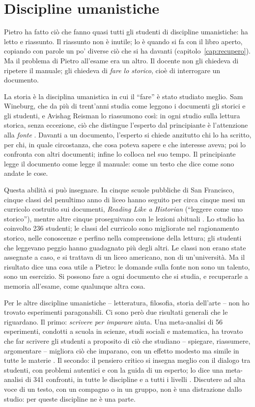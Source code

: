 \section{Discipline umanistiche}

Pietro ha fatto ciò che fanno quasi tutti gli studenti di discipline
umanistiche: ha letto e riassunto. Il riassunto non è inutile; lo è
quando si fa con il libro aperto, copiando con parole un po' diverse
ciò che si ha davanti (capitolo~\ref{cap:recupero}). Ma il problema di
Pietro all'esame era un altro. Il docente non gli chiedeva di ripetere
il manuale; gli chiedeva di \emph{fare lo storico}, cioè di interrogare
un documento.

La storia è la disciplina umanistica in cui il \enquote{fare} è stato
studiato meglio. Sam Wineburg, che da più di trent'anni studia come leggono i
documenti gli storici e gli studenti, e Avishag Reisman lo riassumono
così: in ogni studio sulla lettura storica, senza eccezione, ciò che
distingue l'esperto dal principiante è l'attenzione alla
\emph{fonte} \parencite{wineburg2015}. Davanti a un documento,
l'esperto si chiede anzitutto chi lo ha scritto, per chi, in quale
circostanza, che cosa poteva sapere e che interesse aveva; poi lo
confronta con altri documenti; infine lo colloca nel suo tempo. Il
principiante legge il documento come legge il manuale: come un testo
che dice come sono andate le cose.

Questa abilità si può insegnare. In cinque scuole pubbliche di San
Francisco, cinque classi del penultimo anno di liceo hanno seguito per
circa cinque mesi un curricolo costruito sui documenti, \emph{Reading
Like a Historian} (\enquote{leggere come uno storico}), mentre altre
cinque proseguivano con le lezioni abituali \parencite{reisman2012}.
Lo studio ha coinvolto 236 studenti; le classi del curricolo sono
migliorate nel
ragionamento storico, nelle conoscenze e perfino nella comprensione
della lettura; gli studenti che leggevano peggio hanno guadagnato più
degli altri. Le classi non erano state assegnate a caso, e si trattava
di un liceo americano, non di un'università. Ma il risultato dice una
cosa utile a Pietro: le domande sulla fonte non sono un talento, sono
un esercizio. Si possono fare a ogni documento che si studia, e
recuperarle a memoria all'esame, come qualunque altra cosa.

Per le altre discipline umanistiche -- letteratura, filosofia, storia
dell'arte -- non ho trovato esperimenti paragonabili. Ci sono però due
risultati generali che le riguardano. Il primo: \emph{scrivere per
imparare} aiuta. Una meta-analisi di 56 esperimenti, condotti a scuola
in scienze, studi sociali e matematica, ha trovato che far scrivere gli
studenti a proposito di ciò che studiano -- spiegare, riassumere,
argomentare -- migliora ciò che imparano, con un effetto modesto ma
simile in tutte le materie \parencite{graham2020}. Il secondo: il
pensiero critico si insegna meglio con il dialogo tra studenti, con
problemi autentici e con la guida di un esperto; lo dice una
meta-analisi di 341 confronti, in tutte le discipline e a tutti i
livelli \parencite{abrami2015}. Discutere ad alta voce di un testo, con
un compagno o in un gruppo, non è una distrazione dallo studio: per
queste discipline ne è una parte.

